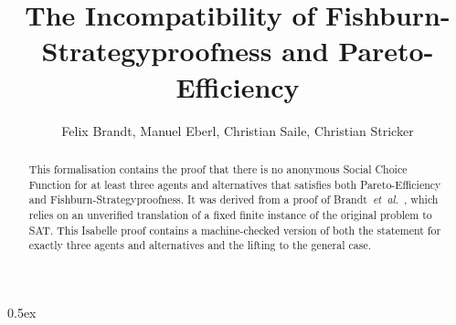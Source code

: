 \documentclass[11pt,a4paper]{article}
\begin{document}
\title{The Incompatibility of Fishburn-Strategyproofness and Pareto-Efficiency}
\author{Felix Brandt, Manuel Eberl, Christian Saile, Christian Stricker}
\maketitle

\begin{abstract}
This formalisation contains the proof that there is no anonymous Social Choice Function for at least three agents and alternatives that satisfies both Pareto-Efficiency and Fishburn-Strategyproofness. It was derived from a proof of Brandt\ \textit{et~al.}~\cite{BSS17a}, which relies on an unverified translation of a fixed finite instance of the original problem to SAT. This Isabelle proof contains a machine-checked version of both the statement for exactly three agents and alternatives and the lifting to the general case.
\end{abstract}

\tableofcontents

\parindent 0pt\parskip 0.5ex
\newpage

 



\end{document}
